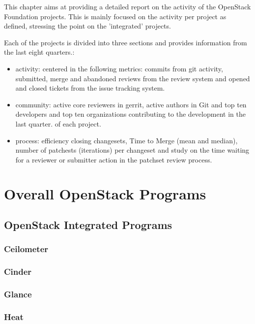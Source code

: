 \documentclass[a4wide,11pt]{report}
\begin{document}
This chapter aims at providing a detailed report on the activity of the OpenStack Foundation projects.
This is mainly focused on the activity per project as defined, stressing the point on the 'integrated' projects.

Each of the projects is divided into three sections and provides information from the last eight quarters.: 
\begin{itemize}
\item activity: centered in the following metrics: commits from git activity, submitted, merge and abandoned reviews from the review system and
opened and closed tickets from the issue tracking system. 
\item community: active core reviewers in gerrit, active authors in Git and top ten developers and top ten organizations contributing to the development in the last quarter.
of each project.
\item process: efficiency closing changesets, Time to Merge (mean and median), number of patchests (iterations) per changeset and study on the time waiting for a reviewer or submitter action in the patchset review process.
\end{itemize}


\newpage
\section{Overall OpenStack Programs}


\newpage
\subsection{OpenStack Integrated Programs}


\newpage 
\subsubsection{Ceilometer}


\newpage 
\subsubsection{Cinder}


\newpage 
\subsubsection{Glance}


\newpage 
\subsubsection{Heat}

\end{document}
